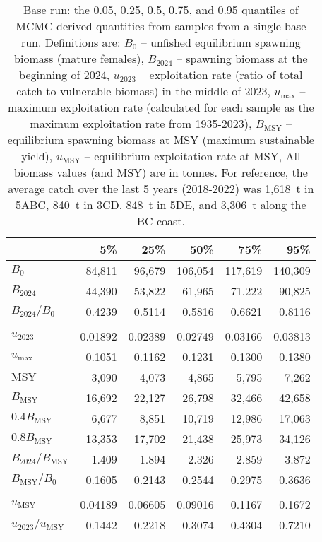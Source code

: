 \documentclass[11pt]{book}
\begin{document}
\begin{table}[ht]
\centering
\caption{Base run: the 0.05, 0.25, 0.5, 0.75, and 0.95 quantiles of MCMC-derived quantities from \Nbase{} samples  from a single base run. Definitions are: $B_0$ -- unfished equilibrium spawning biomass (mature females), $B_{2024}$ -- spawning biomass at the beginning of 2024, $u_{2023}$ -- exploitation rate (ratio of total catch to vulnerable biomass) in the middle of 2023, $u_\text{max}$ -- maximum exploitation rate (calculated for each sample as the maximum exploitation rate from 1935-2023), $B_\text{MSY}$ -- equilibrium spawning biomass at MSY (maximum sustainable yield), $u_\text{MSY}$ -- equilibrium exploitation rate at MSY, All biomass values (and MSY) are in tonnes. For reference, the average catch over the last 5 years (2018-2022) was 1,618~t in 5ABC, 840~t in 3CD, 848~t in 5DE, and 3,306~t along the BC coast.} 
\label{tab:pop.base.rfpt}
\begin{tabular}{lrrrrr}
  \\[-1.0ex] \hline
 & 5\% & 25\% & 50\% & 75\% & 95\% \\ 
  \hline
$B_{0}$ & 84,811 & 96,679 & 106,054 & 117,619 & 140,309 \\ 
  $B_{2024}$ & 44,390 & 53,822 & 61,965 & 71,222 & 90,825 \\ 
  $B_{2024}/B_{0}$ & 0.4239 & 0.5114 & 0.5816 & 0.6621 & 0.8116 \\ 
   \hdashline \\[-1.75ex]$u_{2023}$ & 0.01892 & 0.02389 & 0.02749 & 0.03166 & 0.03813 \\ 
  $u_\text{max}$ & 0.1051 & 0.1162 & 0.1231 & 0.1300 & 0.1380 \\ 
   \hline
$\text{MSY}$ & 3,090 & 4,073 & 4,865 & 5,795 & 7,262 \\ 
  $B_\text{MSY}$ & 16,692 & 22,127 & 26,798 & 32,466 & 42,658 \\ 
  $0.4B_{\text{MSY}}$ & 6,677 & 8,851 & 10,719 & 12,986 & 17,063 \\ 
  $0.8B_{\text{MSY}}$ & 13,353 & 17,702 & 21,438 & 25,973 & 34,126 \\ 
  $B_{2024}/B_\text{MSY}$ & 1.409 & 1.894 & 2.326 & 2.859 & 3.872 \\ 
  $B_\text{MSY}/B_{0}$ & 0.1605 & 0.2143 & 0.2544 & 0.2975 & 0.3636 \\ 
   \hdashline \\[-1.75ex]$u_\text{MSY}$ & 0.04189 & 0.06605 & 0.09016 & 0.1167 & 0.1672 \\ 
  $u_{2023}/u_\text{MSY}$ & 0.1442 & 0.2218 & 0.3074 & 0.4304 & 0.7210 \\ 
   \hline
\end{tabular}
\end{table}
\end{document}
